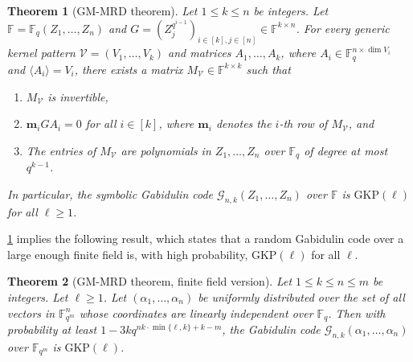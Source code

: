 \documentclass[11pt]{article}
\theoremstyle{plain}
\newtheorem{thm}{Theorem}[section]
\theoremstyle{definition}
\theoremstyle{remark}
\newcommand{\F}{\mathbb{F}}
\newcommand{\vm}{\bm{m}}
\def \mG {\mathcal{G}}
\begin{document}
\begin{thm}[GM-MRD theorem]\label{thm:GM-MRD-v1-new}
Let $1\leq k\leq n$ be integers.
Let $\F=\F_q(Z_1,\dots,Z_n)$ and $G=\left(Z_j^{q^{i-1}}\right)_{i\in [k], j\in [n]}\in\F^{k\times n}$.
For every generic kernel pattern $\mathcal{V}=(V_1,\dots,V_k)$ and matrices $A_1,\dots,A_k$, where $A_i\in\F_q^{n\times \dim V_i}$ and $\langle A_i\rangle=V_i$, there exists a matrix $M_{\mathcal{V}}\in \F^{k\times k}$ such that
\begin{enumerate}
\item\label{item:gmmrd1} $M_{\mathcal{V}}$ is invertible,
\item\label{item:gmmrd2} $\vm_i G A_i=0$ for all $i\in [k]$, where $\vm_i$ denotes the $i$-th row of $M_{\mathcal{V}}$, and
\item\label{item:gmmrd3} The entries of $M_{\mathcal{V}}$ are polynomials in $Z_1,\dots,Z_n$ over $\F_q$ of degree at most $q^{k-1}$.
\end{enumerate}
In particular, the symbolic Gabidulin code $\mG_{n,k}(Z_1,\dots, Z_n)$ over $\F$ is $\mathrm{GKP}(\ell)$ for all $\ell\geq 1$.
\end{thm}

\cref{thm:GM-MRD-v1-new} implies the following result, which states that a random Gabidulin code over a large enough finite field is, with high probability, $\mathrm{GKP}(\ell)$ for all $\ell$.

\begin{thm}[GM-MRD theorem, finite field version]\label{thm:GM-MRD-finite}
Let $1\leq k\leq n\leq m$ be integers. Let $\ell\geq 1$. Let $(\alpha_1,\dots,\alpha_n)$ be uniformly distributed over the set of all vectors in $\F_{q^m}^n$ whose coordinates are linearly independent over $\F_q$. Then with probability at least $1-3kq^{nk\cdot\min\{\ell,k\}+k-m}$, the Gabidulin code $\mG_{n,k}(\alpha_1,\dots, \alpha_n)$ over $\F_{q^m}$ is $\mathrm{GKP}(\ell)$.
\end{thm}
\end{document}
